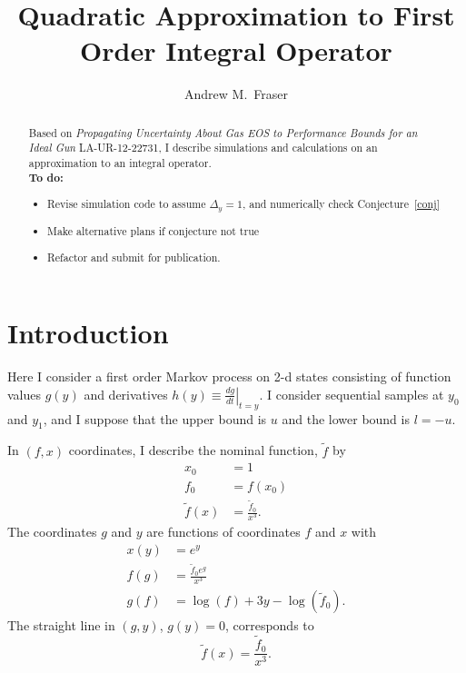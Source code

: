 \documentclass[twocolumn]{article}
\title{Quadratic Approximation to First Order Integral Operator}
\author{Andrew M.\ Fraser}
\begin{document}
\maketitle
\begin{abstract}
  Based on \emph{Propagating Uncertainty About Gas EOS to Performance
    Bounds for an Ideal Gun} LA-UR-12-22731, I describe simulations
  and calculations on an approximation to an
  integral operator.\\
  \textbf{To do:}
  \begin{itemize}
  \item Revise simulation code to assume $\Delta_y = 1$, and
    numerically check Conjecture~\ref{conj}
  \item Make alternative plans if conjecture not true
  \item Refactor and submit for publication.
  \end{itemize}
\end{abstract}
\section{Introduction}
  \label{sec:introduction}

Here I consider a first order Markov process on 2-d states consisting
of function values $g(y)$ and derivatives $h(y) \equiv \left. \frac{d
    g }{d t} \right|_{t=y}$.  I consider sequential samples at $y_0$
and $y_1$, and I suppose that the upper bound is $u$ and the lower
bound is $l=-u$.

In $(f,x)$ coordinates, I describe the nominal function, $\tilde f$ by
\begin{align*}
  x_0 &= 1\\
  f_0 &= f(x_0) \\
  \tilde f(x) &= \frac{\tilde f_0}{x^3}.
\end{align*}
The coordinates $g$ and $y$ are functions of coordinates $f$ and $x$ with
\begin{align*}
  x(y) &= e^y \\
  f(g) &= \frac{\tilde f_0 e^{g}}{x^3} \\
  g(f) &= \log(f) + 3y - \log(\tilde f_0).
\end{align*}
The straight line in $(g,y)$, $g(y) = 0$, corresponds to
\begin{equation*}
  \tilde f(x) = \frac{\tilde f_0}{x^3}.
\end{equation*}
\end{document}
